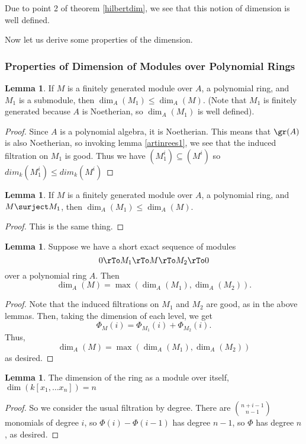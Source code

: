 \documentclass[12 pt]{article}
\theoremstyle{definition}
\newtheorem{lemma}[theorem]{Lemma}
\begin{document}
Due to point 2 of theorem \ref{hilbertdim}, we see that this notion of dimension is well defined.

Now let us derive some properties of the dimension.




\subsubsection{Properties of Dimension of Modules over Polynomial Rings}

\begin{lemma} If $M$ is a finitely generated module over $A$, a polynomial ring, and $M_1$ is a submodule, then $\dim_A(M_1) \leq \dim_A(M)$. (Note that $M_1$ is finitely generated because $A$ is Noetherian, so $\dim_A(M_1)$ is well defined).
\end{lemma}
\begin{proof} Since $A$ is a polynomial algebra, it is Noetherian. This means that $\gr(A)$ is also Noetherian, so invoking lemma \ref{artinrees1}, we see that the induced filtration on $M_1$ is good. Thus we have $(M_1^i) \subseteq (M^i)$ so $dim_k(M_1^i) \leq dim_k(M^i)$
\end{proof}



\begin{lemma} If $M$ is a finitely generated module over $A$, a polynomial ring, and $M \surject M_1$, then $\dim_A(M_1) \leq \dim_A(M)$.
\end{lemma}
\begin{proof} This is the same thing.
\end{proof}


\begin{lemma} Suppose we have a short exact sequence of modules
\[0 \rTo M_1 \rTo M \rTo M_2 \rTo 0\]
over a polynomial ring $A$. Then
\[\dim_A(M)=\max(\dim_A(M_1), \dim_A(M_2)).\]
\label{ses hilb dim}
\end{lemma}
\begin{proof} Note that the induced filtrations on $M_1$ and $M_2$ are good, as in the above lemmas. Then, taking the dimension of each level, we get
\[\Phi_M(i)=\Phi_{M_1}(i)+\Phi_{M_2}(i).\]
Thus,
\[\dim_A(M)=\max(\dim_A(M_1), \dim_A(M_2))\]
as desired.
\end{proof}



\begin{lemma} The dimension of the ring as a module over itself, $\dim(k[x_1, \ldots x_n])=n$
\end{lemma}
\begin{proof} So we consider the usual filtration by degree. There are $\binom{n+i-1}{n-1}$ monomials of degree $i$, so $\Phi(i)-\Phi(i-1)$ has degree $n-1$, so $\Phi$ has degree $n$, as desired.
\end{proof}
\end{document}
